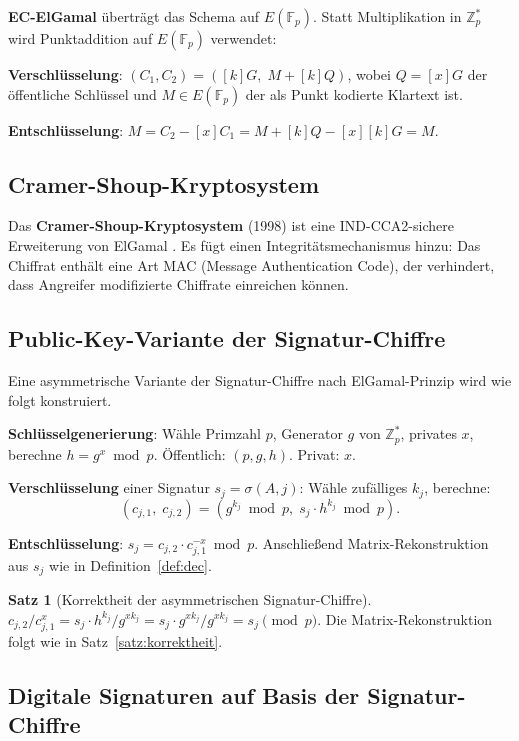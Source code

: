 ﻿\documentclass[a4paper,12pt]{scrreprt}
\theoremstyle{definition}
\newtheorem{satz}{Satz}[section]
\begin{document}
\textbf{EC-ElGamal} überträgt das Schema auf $E(\mathbb{F}_p)$. Statt Multiplikation in $\mathbb{Z}_p^*$ wird Punktaddition auf $E(\mathbb{F}_p)$ verwendet:

\textbf{Verschlüsselung}: $(C_1, C_2) = ([k]G,\; M + [k]Q)$, wobei $Q = [x]G$ der öffentliche Schlüssel und $M \in E(\mathbb{F}_p)$ der als Punkt kodierte Klartext ist.

\textbf{Entschlüsselung}: $M = C_2 - [x]C_1 = M + [k]Q - [x][k]G = M$.

\subsection{Cramer-Shoup-Kryptosystem}

Das \textbf{Cramer-Shoup-Kryptosystem} (1998) ist eine IND-CCA2-sichere Erweiterung von ElGamal \cite{ElG85}. Es fügt einen Integritätsmechanismus hinzu: Das Chiffrat enthält eine Art MAC (Message Authentication Code), der verhindert, dass Angreifer modifizierte Chiffrate einreichen können.

\subsection{Public-Key-Variante der Signatur-Chiffre}

Eine asymmetrische Variante der Signatur-Chiffre nach ElGamal-Prinzip wird wie folgt konstruiert.

\textbf{Schlüsselgenerierung}: Wähle Primzahl $p$, Generator $g$ von $\mathbb{Z}_p^*$, privates $x$, berechne $h = g^x \bmod p$. Öffentlich: $(p, g, h)$. Privat: $x$.

\textbf{Verschlüsselung} einer Signatur $s_j = \sigma(A,j)$: Wähle zufälliges $k_j$, berechne:
\[
(c_{j,1},\; c_{j,2}) = (g^{k_j} \bmod p,\; s_j \cdot h^{k_j} \bmod p).
\]

\textbf{Entschlüsselung}: $s_j = c_{j,2} \cdot c_{j,1}^{-x} \bmod p$. Anschließend Matrix-Rekonstruktion aus $s_j$ wie in Definition~\ref{def:dec}.

\begin{satz}[Korrektheit der asymmetrischen Signatur-Chiffre]
$c_{j,2} / c_{j,1}^x = s_j \cdot h^{k_j} / g^{xk_j} = s_j \cdot g^{xk_j} / g^{xk_j} = s_j \pmod{p}$. Die Matrix-Rekonstruktion folgt wie in Satz~\ref{satz:korrektheit}.
\end{satz}

\subsection{Digitale Signaturen auf Basis der Signatur-Chiffre}
\end{document}
